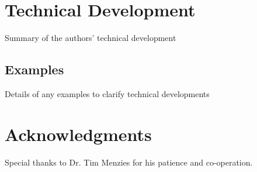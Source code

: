\documentclass{acm_proc_article-sp}
\begin{document}
\section{Technical Development}
\label{tech}
Summary of the authors' technical development

\subsection{Examples}
\label{tech-examples}
Details of any examples to clarify technical developments

\section{Acknowledgments}
Special thanks to Dr. Tim Menzies for his patience and co-operation.

%

%

\balancecolumns
\end{document}
